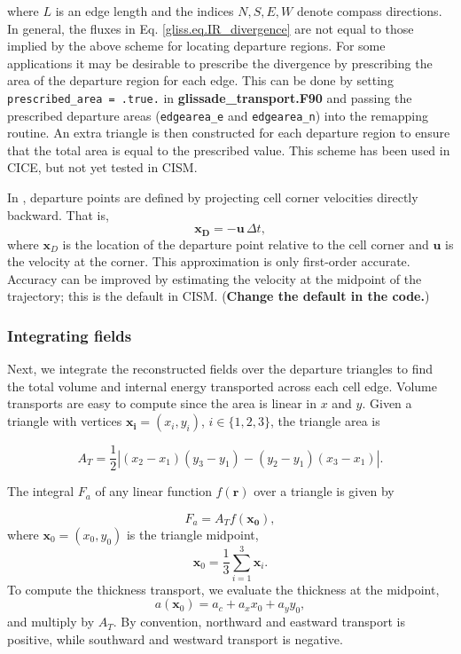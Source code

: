 \noindent
where $L$ is an edge length and the indices $N, S, E, W$ denote compass directions.  
In general, the fluxes in Eq. \eqref{gliss.eq.IR_divergence} are not equal to those implied by the above scheme for locating departure regions.  
For some applications it may be desirable to prescribe the divergence by prescribing the area of the departure region for each edge.  
This can be done by setting {\tt prescribed\_area  = .true.} in {\bf glissade\_transport.F90} and passing the prescribed departure areas 
({\tt edgearea\_e} and {\tt edgearea\_n}) into the remapping routine.  
An extra triangle is then constructed for each departure region to ensure that the total area is equal to the prescribed value.  
This scheme has been used in CICE, but not yet tested in CISM.

In \citet{Dukowicz2000}, departure points are defined by projecting cell
corner velocities directly backward.  That is,
\begin{equation}
  \label{gliss.eq.IR_departure_points} 
  \mathbf{x_D} = -\mathbf{u} \, \Delta t,
\end{equation}
where $\mathbf{x}_D$ is the location of the departure point
relative to the cell corner and $\mathbf{u}$ is the velocity at the corner. 
This approximation is only first-order accurate. Accuracy can be improved by estimating the 
velocity at the midpoint of the trajectory; this is the default in CISM.
(\textbf{Change the default in the code.})

\subsubsection{Integrating fields}
\label{sc:glissade-IR-integrate}

Next, we integrate the reconstructed fields over the departure
triangles to find the total volume and internal energy transported
across each cell edge.  Volume transports are easy to compute since the
area is linear in $x$ and $y$.  Given a triangle with vertices
$\mathbf{x_i} = (x_i,y_i)$, $i\in\{1,2,3\}$, the triangle area is

\begin{equation}
  A_T = \frac{1}{2}\left|(x_2-x_1)(y_3-y_1) - (y_2-y_1)(x_3-x_1)\right|.
\end{equation}

\noindent
The integral $F_a$ of any linear function $f(\mathbf{r})$ over a triangle is given by

\begin{equation}
  \label{gliss.eq.IR_integrate1}
  F_a = A_T f(\mathbf{x_0}),
\end{equation}
where $\mathbf{x}_0 = (x_0,y_0)$ is the triangle midpoint,
\begin{equation}
  \mathbf{x}_0 = \frac{1}{3} \sum_{i=1}^3\mathbf{x}_i.
\end{equation}
To compute the thickness transport, we evaluate the thickness at the midpoint,
\begin{equation}
  a(\mathbf{x}_0)  = a_c + a_x x_0 + a_y y_0,
\end{equation}
and multiply by $A_T$.  By convention, northward and eastward
transport is positive, while southward and westward transport is
negative.

